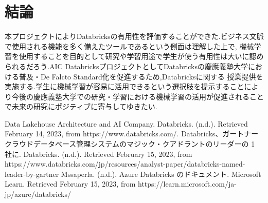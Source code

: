 \documentclass[twocolumn]{jsarticle}
\begin{document}
\section{結論}
本プロジェクトによりDatabricksの有用性を評価することができた.ビジネス文脈で使用される機能を多く備えたツールであるという側面は理解した上で,
機械学習を使用することを目的として研究や学習用途で学生が使う有用性は大いに認められるだろう.AIC DatabricksプロジェクトとしてDatabricksの慶應義塾大学における普及・De Falcto Standard化を促進するため,Databricksに関する
授業提供を実施する.学生に機械学習が容易に活用できるという選択肢を提示することにより今後の慶應義塾大学での研究・学習における機械学習の活用が促進されることで未来の研究にポジティブに寄与してゆきたい.

\begin{thebibliography}{3}
  \tiny
   Data Lakehouse Architecture and AI Company. Databricks. (n.d.). Retrieved February 14, 2023, from https://www.databricks.com/.
   Databricks、ガートナー クラウドデータベース管理システムのマジック・クアドラントのリーダーの 1 社に. Databricks. (n.d.). Retrieved February 15, 2023, from https://www.databricks.com/jp/resources/analyst-paper/databricks-named-leader-by-gartner
   Mssaperla. (n.d.). Azure Databricks のドキュメント. Microsoft Learn. Retrieved February 15, 2023, from https://learn.microsoft.com/ja-jp/azure/databricks/ 
  \end{thebibliography}
\end{document}
